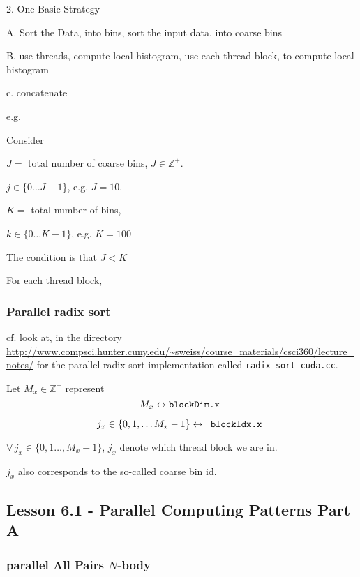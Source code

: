 \documentclass[10pt]{amsart}
\begin{document}
\begin{multicols*}{2}
2. One Basic Strategy

A. Sort the Data, into bins, sort the input data, into coarse bins

B. use threads, compute local histogram, use each thread block, to compute local histogram

c. concatenate

e.g.

Consider

$J = $ total number of coarse bins, $J\in \mathbb{Z}^+$.

$j\in \lbrace 0 \dots J-1 \rbrace$, e.g. $J=10$.

$K = $ total number of bins,

$k\in \lbrace 0 \dots K-1 \rbrace$,  e.g. $K = 100$

The condition is that $J< K$

For each thread block,

\subsubsection{Parallel radix sort}

cf. look at, in the directory 
\url{http://www.compsci.hunter.cuny.edu/~sweiss/course_materials/csci360/lecture_notes/}
for the parallel radix sort implementation called \verb|radix_sort_cuda.cc|.

Let $M_x \in \mathbb{Z}^+$ represent
\begin{equation}
  M_x \leftrightarrow \verb|blockDim.x |
\end{equation}

\begin{equation}
  j_x \in \lbrace 0 , 1 , \dots M_x -1 \rbrace \leftrightarrow \verb| blockIdx.x |
\end{equation}

$\forall \, j_x \in \lbrace 0 , 1 \dots , M_x - 1\rbrace $, $j_x $ denote which thread block we are in.

$j_x$ also corresponds to the so-called coarse bin id.  


\subsection{Lesson 6.1 - Parallel Computing Patterns Part A}

\subsubsection{parallel All Pairs $N$-body}


\end{multicols*}
\end{document}
